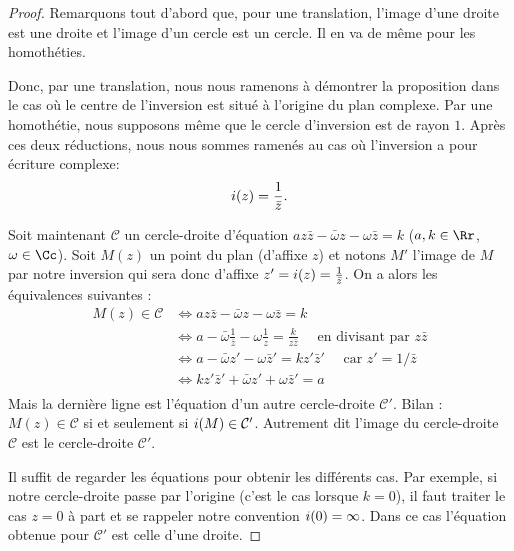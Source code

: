 \documentclass[11pt,class=report,crop=false]{standalone}
\begin{document}
\begin{proof}
Remarquons tout d'abord que, pour une translation, l'image d'une droite est une droite et l'image d'un cercle est un cercle.
Il en va de même pour les homothéties.

Donc, par une translation, nous nous ramenons à démontrer la proposition dans le cas où le centre de l'inversion est situé à l'origine du plan complexe. Par une homothétie, nous supposons même
que le cercle d'inversion est de rayon $1$.
Après ces deux réductions, nous nous sommes ramenés au cas où l'inversion a pour écriture complexe:
$$i(z) = \frac{1}{\bar z}.$$

Soit maintenant $\mathcal{C}$ un cercle-droite d'équation
$az\bar z - \bar \omega z - \omega \bar z = k$
($a,k\in \Rr$, $\omega \in \Cc$).
Soit $M(z)$ un point du plan (d'affixe $z$) et notons
$M'$ l'image de $M$ par notre inversion
qui sera donc d'affixe $z' = i(z) = \frac{1}{\bar z}$.
On a alors les équivalences suivantes :
\begin{align*}
 M(z) \in \mathcal{C} 
   &\iff  az\bar z - \bar \omega z - \omega \bar z = k \\
   &\iff a - \bar \omega\frac{1}{\bar z} - \omega \frac 1 z = \frac{k}{ z\bar z} \quad \text{ en divisant par } z\bar z \\
   &\iff a - \bar \omega z' - \omega \bar z' = k z' \bar z' \quad \text{ car } z' = 1/\bar z\\
   &\iff k z' \bar z' + \bar \omega z' + \omega \bar z' = a \\
\end{align*}
Mais la dernière ligne est l'équation d'un autre cercle-droite $\mathcal{C}'$.
Bilan : $M(z) \in \mathcal{C}$ si et seulement si $i(M) \in \mathcal{C}'$.
Autrement dit l'image du cercle-droite $\mathcal{C}$ est le cercle-droite $\mathcal{C}'$.

Il suffit de regarder les équations pour obtenir les différents cas. Par exemple, si notre cercle-droite passe par l'origine (c'est le cas lorsque $k=0$), il faut traiter le cas $z=0$ à part et se rappeler notre convention $i(0) = \infty$. Dans ce cas l'équation obtenue pour $\mathcal{C}'$ est celle d'une droite.
\end{proof}
\end{document}

